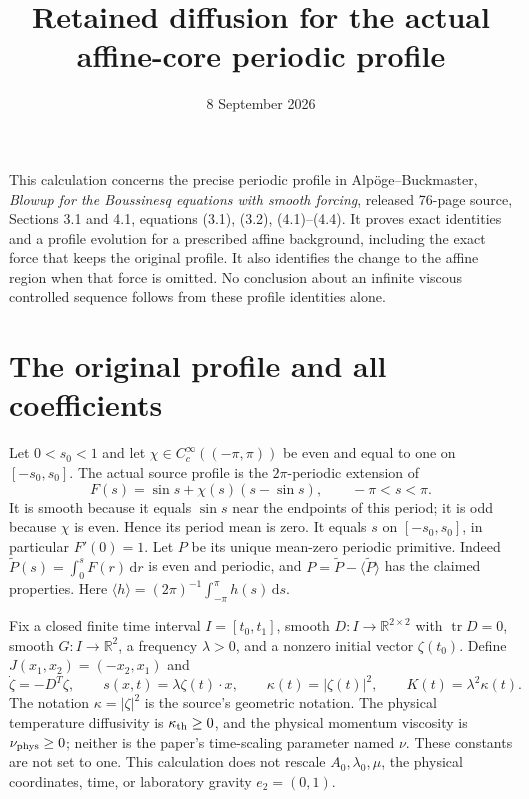 \documentclass[11pt]{article}
\title{Retained diffusion for the actual affine-core periodic profile}
\author{}
\date{8 September 2026}
\newcommand{\R}{\mathbb R}
\newcommand{\dd}{\mathrm d}
\newcommand{\thd}{\kappa_{\rm th}}
\newcommand{\vis}{\nu_{\rm phys}}
\newcommand{\av}[1]{\langle #1\rangle}
\begin{document}
\maketitle

This calculation concerns the precise periodic profile in Alp\"oge--Buckmaster,
\emph{Blowup for the Boussinesq equations with smooth forcing}, released
76-page source, Sections 3.1 and 4.1, equations (3.1), (3.2), (4.1)--(4.4).
It proves exact identities and a profile evolution for a prescribed affine
background, including the exact force that keeps the original profile.
It also identifies the change to the affine region when that force is
omitted. No conclusion about an infinite viscous controlled sequence follows
from these profile identities alone.

\section{The original profile and all coefficients}

Let $0<s_0<1$ and let $\chi\in C_c^\infty((-\pi,\pi))$ be even and equal to
one on $[-s_0,s_0]$. The actual source profile is the $2\pi$-periodic extension
of
\begin{equation}\label{eq:F}
 F(s)=\sin s+\chi(s)(s-\sin s),\qquad -\pi<s<\pi.
\end{equation}
It is smooth because it equals $\sin s$ near the endpoints of this period;
it is odd because $\chi$ is even. Hence its period mean is zero. It equals
$s$ on $[-s_0,s_0]$, in particular $F'(0)=1$. Let $P$ be its unique
mean-zero periodic primitive. Indeed
$\widetilde P(s)=\int_0^s F(r)\,\dd r$ is even and periodic, and
$P=\widetilde P-\av{\widetilde P}$ has the claimed properties. Here
$\av{h}=(2\pi)^{-1}\int_{-\pi}^{\pi}h(s)\,\dd s$.

Fix a closed finite time interval $I=[t_0,t_1]$, smooth
$D:I\to\R^{2\times2}$ with $\operatorname{tr}D=0$, smooth
$G:I\to\R^2$, a frequency $\lambda>0$, and a nonzero initial vector
$\zeta(t_0)$. Define $J(x_1,x_2)=(-x_2,x_1)$ and
\begin{equation}\label{eq:phase}
 \dot\zeta=-D^T\zeta,\qquad s(x,t)=\lambda\zeta(t)\cdot x,
 \qquad \kappa(t)=|\zeta(t)|^2,\qquad K(t)=\lambda^2\kappa(t).
\end{equation}
The notation $\kappa=|\zeta|^2$ is the source's geometric notation.
The physical temperature diffusivity is $\thd\geq0$, and the physical
momentum viscosity is $\vis\geq0$; neither is the paper's time-scaling
parameter named $\nu$. These constants are not set to one. This calculation
does not rescale $A_0,\lambda_0,\mu$, the physical coordinates, time, or
laboratory gravity $e_2=(0,1)$.
\end{document}
